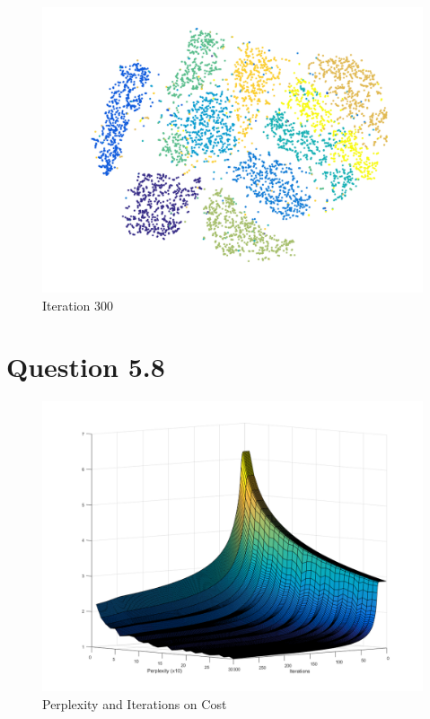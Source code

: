 \begin{figure}[H]
    \includegraphics[width=\linewidth]{../../pracs/week6/images/q6}
    \centering
    \caption{Iteration 300\label{fig:tsne}}
\end{figure}

\section*{Question 5.8}

\begin{figure}[H]
    \includegraphics[width=\linewidth]{../../pracs/week6/images/q8}
    \centering
    \caption{Perplexity and Iterations on Cost}
\end{figure}

